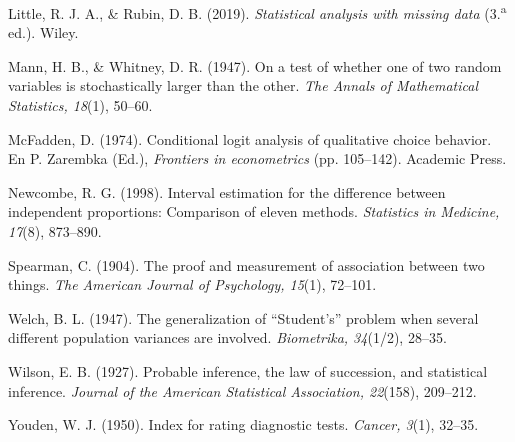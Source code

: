 \documentclass[11pt,a4paper]{article}
\begin{document}
{Little, R. J. A., \& Rubin, D. B. (2019). \emph{Statistical analysis with missing data} (3.\textsuperscript{a} ed.). Wiley.

Mann, H. B., \& Whitney, D. R. (1947). On a test of whether one of two random variables is stochastically larger than the other. \emph{The Annals of Mathematical Statistics, 18}(1), 50--60.

McFadden, D. (1974). Conditional logit analysis of qualitative choice behavior. En P. Zarembka (Ed.), \emph{Frontiers in econometrics} (pp. 105--142). Academic Press.

Newcombe, R. G. (1998). Interval estimation for the difference between independent proportions: Comparison of eleven methods. \emph{Statistics in Medicine, 17}(8), 873--890.

Spearman, C. (1904). The proof and measurement of association between two things. \emph{The American Journal of Psychology, 15}(1), 72--101.

Welch, B. L. (1947). The generalization of ``Student's'' problem when several different population variances are involved. \emph{Biometrika, 34}(1/2), 28--35.

Wilson, E. B. (1927). Probable inference, the law of succession, and statistical inference. \emph{Journal of the American Statistical Association, 22}(158), 209--212.

Youden, W. J. (1950). Index for rating diagnostic tests. \emph{Cancer, 3}(1), 32--35.
}
\end{document}
